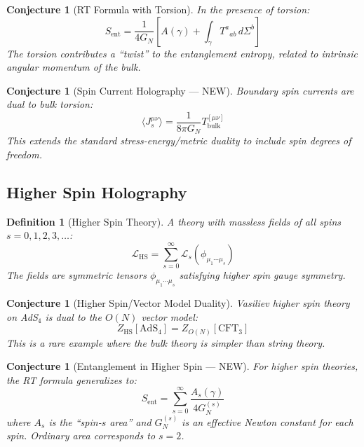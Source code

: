 \documentclass[12pt,a4paper]{article}
\newtheorem{conjecture}[theorem]{Conjecture}
\newtheorem{definition}[theorem]{Definition}
\begin{document}
\begin{conjecture}[RT Formula with Torsion]
In the presence of torsion:
\begin{equation}
S_{\text{ent}} = \frac{1}{4G_N} \left[ A(\gamma) + \int_\gamma T^a{}_{ab} \, d\Sigma^b \right]
\end{equation}
The torsion contributes a ``twist'' to the entanglement entropy, related to intrinsic angular momentum of the bulk.
\end{conjecture}

\begin{conjecture}[Spin Current Holography --- NEW]
Boundary spin currents are dual to bulk torsion:
\begin{equation}
\langle J_s^{\mu\nu} \rangle = \frac{1}{8\pi G_N} T^{[\mu\nu]}_{\text{bulk}}
\end{equation}
This extends the standard stress-energy/metric duality to include spin degrees of freedom.
\end{conjecture}

\subsection{Higher Spin Holography}

\begin{definition}[Higher Spin Theory]
A theory with massless fields of all spins $s = 0, 1, 2, 3, \ldots$:
\begin{equation}
\mathcal{L}_{\text{HS}} = \sum_{s=0}^\infty \mathcal{L}_s(\phi_{\mu_1 \cdots \mu_s})
\end{equation}
The fields are symmetric tensors $\phi_{\mu_1 \cdots \mu_s}$ satisfying higher spin gauge symmetry.
\end{definition}

\begin{conjecture}[Higher Spin/Vector Model Duality]
Vasiliev higher spin theory on AdS$_4$ is dual to the $O(N)$ vector model:
\begin{equation}
Z_{\text{HS}}[\text{AdS}_4] = Z_{O(N)}[\text{CFT}_3]
\end{equation}
This is a rare example where the bulk theory is \textit{simpler} than string theory.
\end{conjecture}

\begin{conjecture}[Entanglement in Higher Spin --- NEW]
For higher spin theories, the RT formula generalizes to:
\begin{equation}
S_{\text{ent}} = \sum_{s=0}^\infty \frac{A_s(\gamma)}{4G_N^{(s)}}
\end{equation}
where $A_s$ is the ``spin-$s$ area'' and $G_N^{(s)}$ is an effective Newton constant for each spin. Ordinary area corresponds to $s = 2$.
\end{conjecture}
\end{document}
